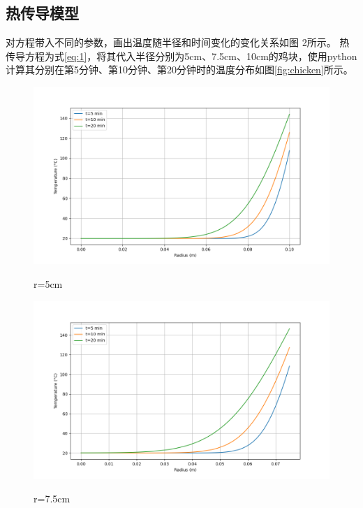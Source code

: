 \documentclass[12pt]{article}
\begin{document}
\subsection{热传导模型}
对方程带入不同的参数，画出温度随半径和时间变化的变化关系如图 2所示。
热传导方程为式\eqref{eq:1}，将其代入半径分别为5cm、7.5cm、10cm的鸡块，使用python计算其分别在第5分钟、第10分钟、第20分钟时的温度分布如图\ref{fig:chicken}所示。
\begin{figure}[htbp]
	\begin{minipage}{0.32\linewidth}
		\vspace{3pt}
		\centerline{\includegraphics[width=\textwidth]{heat_distribution1.png}}
		\centerline{r=5cm}
	\end{minipage}
	\begin{minipage}{0.32\linewidth}
		\vspace{3pt}
		\centerline{\includegraphics[width=\textwidth]{heat_distribution2.png}}
		\centerline{r=7.5cm}
	\end{minipage}
	\begin{minipage}{0.32\linewidth}

\end{minipage}
\end{figure}
\end{document}
